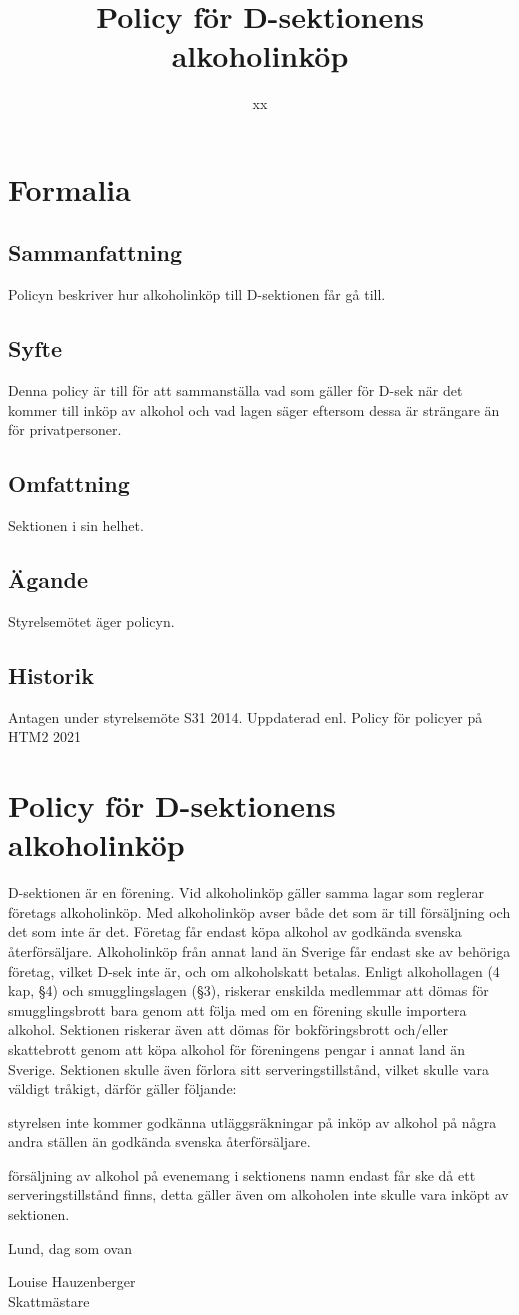 \documentclass{dsekprotokoll}
\title{Policy för D-sektionens alkoholinköp}
\author{xx}
\begin{document}
\section{Formalia}
\subsection{Sammanfattning}
Policyn beskriver hur alkoholinköp till D-sektionen får gå till.
\subsection{Syfte}
Denna policy är till för att sammanställa vad som gäller för D-sek när
det kommer till inköp av alkohol och vad lagen säger eftersom dessa är strängare än för privatpersoner.
\subsection{Omfattning}
Sektionen i sin helhet.
\subsection{Ägande}
Styrelsemötet äger policyn.
\subsection{Historik}
Antagen under styrelsemöte S31 2014.
Uppdaterad enl. Policy för policyer på HTM2 2021
\section{Policy för D-sektionens alkoholinköp}

D-sektionen är en förening. Vid alkoholinköp gäller samma lagar som reglerar
företags alkoholinköp. Med alkoholinköp avser både det som är till försäljning och det som inte är det.
Företag får endast köpa alkohol av godkända svenska återförsäljare. Alkoholinköp från annat
land än Sverige får endast ske av behöriga företag, vilket D-sek inte är, och om alkoholskatt
betalas. Enligt alkohollagen (4 kap, §4) och smugglingslagen (§3), riskerar enskilda medlemmar att dömas för smugglingsbrott bara genom att följa med om en förening skulle importera
alkohol. Sektionen riskerar även att dömas för bokföringsbrott och/eller skattebrott genom att
köpa alkohol för föreningens pengar i annat land än Sverige. Sektionen skulle även förlora sitt
serveringstillstånd, vilket skulle vara väldigt tråkigt, därför gäller följande:
\begin{attlista}
	\item styrelsen inte kommer godkänna utläggsräkningar på inköp av alkohol på några andra ställen än godkända svenska återförsäljare.
	\item försäljning av alkohol på evenemang i sektionens namn endast får ske då ett serveringstillstånd finns, detta gäller även om alkoholen inte skulle vara inköpt av sektionen.

\end{attlista}



Lund, dag som ovan\newline

Louise Hauzenberger\\
Skattmästare
\end{document}

